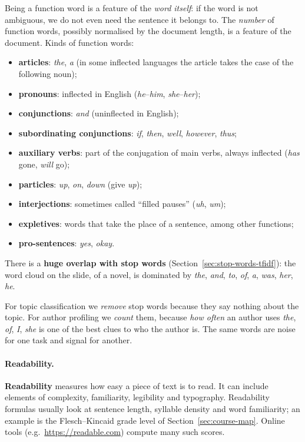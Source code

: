 Being a function word is a feature of the \emph{word itself}: if the word is not
ambiguous, we do not even need the sentence it belongs to. The \emph{number} of function
words, possibly normalised by the document length, is a feature of the document. Kinds of
function words:
\begin{itemize}[nosep]
  \item \textbf{articles}: \emph{the}, \emph{a} (in some inflected languages the article
        takes the case of the following noun);
  \item \textbf{pronouns}: inflected in English (\emph{he}--\emph{him},
        \emph{she}--\emph{her});
  \item \textbf{conjunctions}: \emph{and} (uninflected in English);
  \item \textbf{subordinating conjunctions}: \emph{if}, \emph{then}, \emph{well},
        \emph{however}, \emph{thus};
  \item \textbf{auxiliary verbs}: part of the conjugation of main verbs, always
        inflected (\emph{has} gone, \emph{will} go);
  \item \textbf{particles}: \emph{up}, \emph{on}, \emph{down} (give \emph{up});
  \item \textbf{interjections}: sometimes called ``filled pauses'' (\emph{uh}, \emph{um});
  \item \textbf{expletives}: words that take the place of a sentence, among other
        functions;
  \item \textbf{pro-sentences}: \emph{yes}, \emph{okay}.
\end{itemize}
There is a \textbf{huge overlap with stop words} (Section~\ref{sec:stop-words-tfidf}):
the word cloud on the slide, of a novel, is dominated by \emph{the}, \emph{and},
\emph{to}, \emph{of}, \emph{a}, \emph{was}, \emph{her}, \emph{he}.

\begin{nbwarning}
For topic classification we \emph{remove} stop words because they say nothing about the
topic. For author profiling we \emph{count} them, because \emph{how often} an author uses
\emph{the}, \emph{of}, \emph{I}, \emph{she} is one of the best clues to who the author is.
The same words are noise for one task and signal for another.
\end{nbwarning}

\paragraph{Readability.}
\textbf{Readability} measures how easy a piece of text is to read. It can include
elements of complexity, familiarity, legibility and typography. Readability formulas
usually look at sentence length, syllable density and word familiarity; an example is
the Flesch--Kincaid grade level of Section~\ref{sec:course-map}. Online tools (e.g.\
\url{https://readable.com}) compute many such scores.

